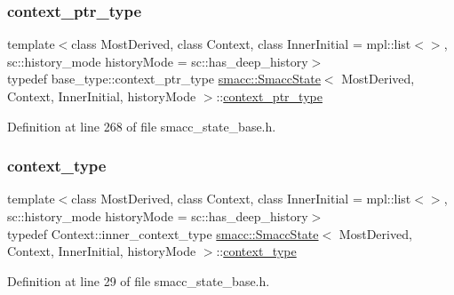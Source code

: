 \subsubsection{\texorpdfstring{context\+\_\+ptr\+\_\+type}{context\_ptr\_type}}
{\footnotesize\ttfamily template$<$class Most\+Derived, class Context, class Inner\+Initial = mpl\+::list$<$$>$, sc\+::history\+\_\+mode history\+Mode = sc\+::has\+\_\+deep\+\_\+history$>$ \\
typedef base\+\_\+type\+::context\+\_\+ptr\+\_\+type \hyperlink{classsmacc_1_1SmaccState}{smacc\+::\+Smacc\+State}$<$ Most\+Derived, Context, Inner\+Initial, history\+Mode $>$\+::\hyperlink{classsmacc_1_1SmaccState_a0e15b77514301039f6bc093a9d3f6425}{context\+\_\+ptr\+\_\+type}}



Definition at line 268 of file smacc\+\_\+state\+\_\+base.\+h.

\mbox{\label{classsmacc_1_1SmaccState_a65c128d05dbcadbf817f41ba20b8fa01}} 
\subsubsection{\texorpdfstring{context\+\_\+type}{context\_type}}
{\footnotesize\ttfamily template$<$class Most\+Derived, class Context, class Inner\+Initial = mpl\+::list$<$$>$, sc\+::history\+\_\+mode history\+Mode = sc\+::has\+\_\+deep\+\_\+history$>$ \\
typedef Context\+::inner\+\_\+context\+\_\+type \hyperlink{classsmacc_1_1SmaccState}{smacc\+::\+Smacc\+State}$<$ Most\+Derived, Context, Inner\+Initial, history\+Mode $>$\+::\hyperlink{classsmacc_1_1SmaccState_a65c128d05dbcadbf817f41ba20b8fa01}{context\+\_\+type}}



Definition at line 29 of file smacc\+\_\+state\+\_\+base.\+h.

\mbox{\label{classsmacc_1_1SmaccState_a65a772c2e2039e9a59148ba6ffb54d8a}} 
